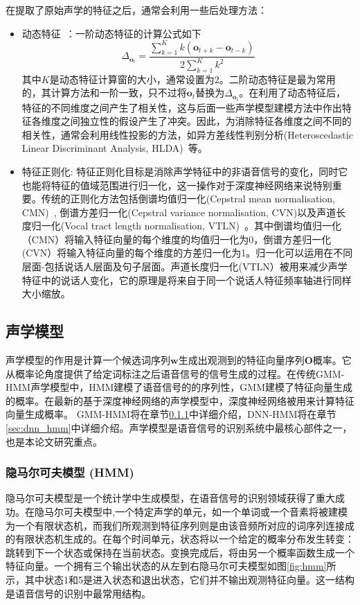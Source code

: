 在提取了原始声学的特征之后，通常会利用一些后处理方法：
\begin{itemize}
    \item 动态特征~\cite{furui1986speaker}：一阶动态特征的计算公式如下
    \begin{equation}
        \Delta_{\mathbf{o}_t}=\frac{\sum_{k=1}^K k(\mathbf{o}_{t+k}-\mathbf{o}_{t-k})}{2\sum_{k=1}^K{k^2}}
    \end{equation}
    其中$K$是动态特征计算窗的大小，通常设置为2。二阶动态特征是最为常用的，其计算方法和一阶一致，只不过将$\mathbf{o}_t$替换为$\Delta_{\mathbf{o}_t}$。在利用了动态特征后，特征的不同维度之间产生了相关性，这与后面一些声学模型建模方法中作出特征各维度之间独立性的假设产生了冲突。因此，为消除特征各维度之间不同的相关性，通常会利用线性投影的方法，如异方差线性判别分析(Heteroscedastic Linear Discriminant Analysis, HLDA)~\cite{kumar1998heteroscedastic}等。
    \item 特征正则化: 特征正则化目标是消除声学特征中的非语音信号的变化，同时它也能将特征的值域范围进行归一化，这一操作对于深度神经网络来说特别重要。传统的正则化方法包括倒谱均值归一化(Cepstral mean normalisation, CMN)~\cite{atal1974effectiveness}, 倒谱方差归一化(Cepstral variance normalisation, CVN)\cite{woodland1995development}以及声道长度归一化(Vocal tract length normalisation, VTLN)~\cite{lee1996speaker}。其中倒谱均值归一化（CMN）将输入特征向量的每个维度的均值归一化为0，倒谱方差归一化(CVN）将输入特征向量的每个维度的方差归一化为1。归一化可以运用在不同层面-包括说话人层面及句子层面。声道长度归一化(VTLN）被用来减少声学特征中的说话人变化，它的原理是将来自于同一个说话人特征频率轴进行同样大小缩放。
\end{itemize}

\subsection{声学模型}
声学模型的作用是计算一个候选词序列$\mathbf{w}$生成出观测到的特征向量序列$\mathbf{O}$概率。它从概率论角度提供了给定词标注之后语音信号的信号生成的过程。在传统GMM-HMM声学模型中，HMM建模了语音信号的的序列性，GMM建模了特征向量生成的概率。在最新的基于深度神经网络的声学模型中，深度神经网络被用来计算特征向量生成概率。 GMM-HMM将在章节\ref{sec:hmm}中详细介绍，DNN-HMM将在章节\ref{sec:dnn_hmm}中详细介绍。声学模型是语音信号的识别系统中最核心部件之一，也是本论文研究重点。

\subsubsection{隐马尔可夫模型 (HMM)}
\label{sec:hmm}
隐马尔可夫模型是一个统计学中生成模型，在语音信号的识别领域获得了重大成功。在隐马尔可夫模型中,一个特定声学的单元，如一个单词或一个音素将被建模为一个有限状态机，而我们所观测到特征序列则是由该音频所对应的词序列连接成的有限状态机生成的。在每个时间单元，状态将以一个给定的概率分布发生转变：跳转到下一个状态或保持在当前状态。变换完成后，将由另一个概率函数生成一个特征向量。一个拥有三个输出状态的从左到右隐马尔可夫模型如图\ref{fig:hmm}所示，其中状态1和5是进入状态和退出状态，它们并不输出观测特征向量。这一结构是语音信号的识别中最常用结构。


